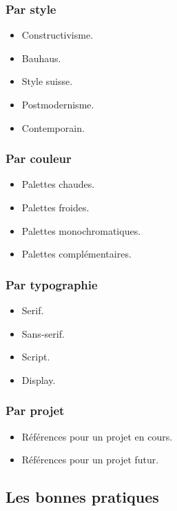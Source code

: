 \subsubsection{Par style}

\begin{itemize}
    \item Constructivisme.
    \item Bauhaus.
    \item Style suisse.
    \item Postmodernisme.
    \item Contemporain.
\end{itemize}

\subsubsection{Par couleur}

\begin{itemize}
    \item Palettes chaudes.
    \item Palettes froides.
    \item Palettes monochromatiques.
    \item Palettes complémentaires.
\end{itemize}

\subsubsection{Par typographie}

\begin{itemize}
    \item Serif.
    \item Sans-serif.
    \item Script.
    \item Display.
\end{itemize}

\subsubsection{Par projet}

\begin{itemize}
    \item Références pour un projet en cours.
    \item Références pour un projet futur.
\end{itemize}

\subsection{Les bonnes pratiques}

